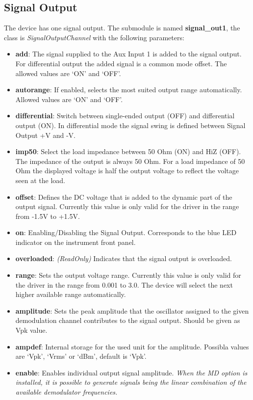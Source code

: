 \documentclass[11pt]{article} %
\begin{document}
\subsection{Signal Output}
The device has one signal output. The submodule is named {\bf signal\_out1}, the class is {\it SignalOutputChannel} with the following parameters:
\begin{itemize}
\item {\bf add}: The signal supplied to the Aux Input 1 is added to the signal output. For differential output the added signal is a common mode offset. The allowed values are `ON' and `OFF'.
\item {\bf autorange}: If enabled, selects the most suited output range automatically. Allowed values are `ON' and `OFF'.
\item {\bf differential}: Switch between single-ended output (OFF) and differential output (ON). In differential mode the signal swing is defined between Signal Output +V and -V.
\item {\bf imp50}: Select the load impedance between 50 Ohm (ON) and HiZ (OFF). The impedance of the output is always 50 Ohm. For a load impedance of 50 Ohm the displayed voltage is half the output voltage to reflect the voltage seen at the load.
\item {\bf offset}: Defines the DC voltage that is added to the dynamic part of the output signal. Currently this value is only valid for the driver in the range from -1.5V to +1.5V.
\item {\bf on}: Enabling/Disabling the Signal Output. Corresponds to the blue LED indicator on the instrument front panel.
\item {\bf overloaded}: {\it (ReadOnly)} Indicates that the signal output is overloaded.
\item {\bf range}: Sets the output voltage range. Currently this value is only valid for the driver in the range from 0.001 to 3.0. The device will select the next higher available range automatically.
\item {\bf amplitude}: Sets the peak amplitude that the oscillator assigned to the given demodulation channel contributes to the signal output. Should be given as Vpk value.
\item {\bf ampdef}: Internal storage for the used unit for the amplitude. Possibla values are `Vpk', `Vrms' or `dBm', default is `Vpk'.
\item {\bf enable}: Enables individual output signal amplitude. {\it When the MD option is installed, it is possible to generate signals being the linear combination of the available demodulator frequencies.}
\end{itemize}
\end{document}
